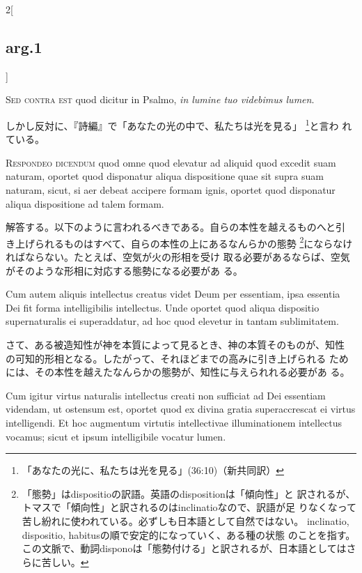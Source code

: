 \documentclass[paper=a4paper,fontsize=10pt,jafontsize=9pt,titlepage]{jlreq}
\begin{document}
\begin{paracol}{2}[\subsection{arg.1}]
\switchcolumn*[\subsection{s.c.}]

{\scshape  Sed contra est} quod dicitur in Psalmo, {\itshape in lumine tuo videbimus lumen}.

\switchcolumn

しかし反対に、『詩編』で「あなたの光の中で、私たちは光を見る」
\footnote{「あなたの光に、私たちは光を見る」(36:10)（新共同訳）}と言わ
れている。


{\scshape Respondeo dicendum} quod omne quod elevatur ad aliquid quod
excedit suam naturam, oportet quod disponatur aliqua dispositione quae
sit supra suam naturam, sicut, si aer debeat accipere formam ignis,
oportet quod disponatur aliqua dispositione ad talem formam.

\switchcolumn

解答する。以下のように言われるべきである。自らの本性を越えるものへと引
き上げられるものはすべて、自らの本性の上にあるなんらかの態勢
\footnote{「態勢」はdispositioの訳語。英語のdispositionは「傾向性」と
訳されるが、トマスで「傾向性」と訳されるのはinclinatioなので、訳語が足
りなくなって苦し紛れに使われている。必ずしも日本語として自然ではない。
inclinatio, dispositio, habitusの順で安定的になっていく、ある種の状態
のことを指す。この文脈で、動詞disponoは「態勢付ける」と訳されるが、日本語としてはさらに苦しい。}にならなければならない。たとえば、空気が火の形相を受け
取る必要があるならば、空気がそのような形相に対応する態勢になる必要があ
る。

\switchcolumn*

Cum autem aliquis intellectus creatus videt Deum per essentiam, ipsa
essentia Dei fit forma intelligibilis intellectus. Unde oportet quod
aliqua dispositio supernaturalis ei superaddatur, ad hoc quod elevetur
in tantam sublimitatem.

\switchcolumn

さて、ある被造知性が神を本質によって見るとき、神の本質そのものが、知性
の可知的形相となる。したがって、それほどまでの高みに引き上げられる
ためには、その本性を越えたなんらかの態勢が、知性に与えられれる必要があ
る。

\switchcolumn*

Cum igitur virtus naturalis intellectus creati
non sufficiat ad Dei essentiam videndam, ut ostensum est, oportet quod
ex divina gratia superaccrescat ei virtus intelligendi. Et hoc
augmentum virtutis intellectivae illuminationem intellectus vocamus;
sicut et ipsum intelligibile vocatur lumen.


\end{paracol}
\end{document}
